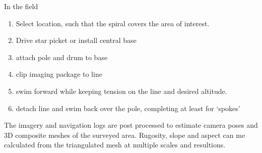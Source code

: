 In the field\begin{enumerate}
\item Select location, such that the spiral covers the area of interest.
\item Drive star picket or install central base
\item attach pole and drum to base
\item clip imaging package to line
\item swim forward while keeping tension on the line and desired altitude.
\item detach line and swim back over the pole, completing at least for `spokes'
\end{enumerate}

The imagery and navigation logs are post processed to estimate camera poses and 3D composite meshes of the surveyed area. Rugosity, slope and aspect can me calculated from the triangulated mesh at multiple scales and resultions. 

